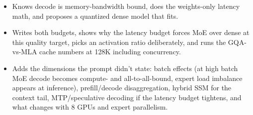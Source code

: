 \begin{interviewq}
\goodgreat
\begin{itemize}
    \item {} Knows decode is memory-bandwidth bound, does the weights-only latency math, and proposes a quantized dense model that fits.
    \item {} Writes both budgets, shows why the latency budget forces MoE over dense at this quality target, picks an activation ratio deliberately, and runs the GQA-vs-MLA cache numbers at 128K including concurrency.
    \item {} Adds the dimensions the prompt didn't state: batch effects (at high batch MoE decode becomes compute- and all-to-all-bound, expert load imbalance appears at inference), prefill/decode disaggregation, hybrid SSM for the context tail, MTP/speculative decoding if the latency budget tightens, and what changes with 8 GPUs and expert parallelism.
\end{itemize}

\end{interviewq}

